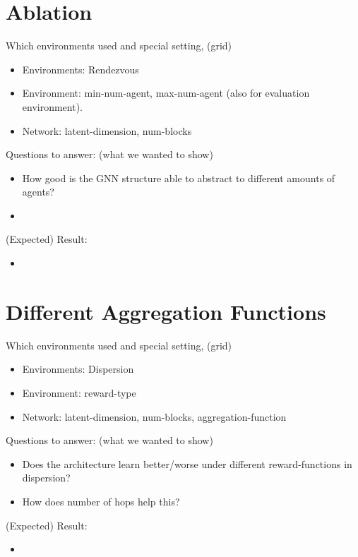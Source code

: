 \section{Ablation}
\label{sec:Ablation}
Which environments used and special setting, (grid)
\begin{itemize}[noitemsep,nolistsep]
    \item Environments: Rendezvous
    \item Environment: min-num-agent, max-num-agent (also for evaluation environment).
    \item Network: latent-dimension, num-blocks
\end{itemize}
Questions to answer: (what we wanted to show)
\begin{itemize}[noitemsep,nolistsep]
    \item How good is the GNN structure able to abstract to different amounts of agents?
    \item 
\end{itemize}
(Expected) Result:
\begin{itemize}[noitemsep,nolistsep]
    \item 
\end{itemize}



\section{Different Aggregation Functions}
\label{sec:Different Aggregation Functions}
Which environments used and special setting, (grid)
\begin{itemize}[noitemsep,nolistsep]
    \item Environments: Dispersion
    \item Environment: reward-type
    \item Network: latent-dimension, num-blocks, aggregation-function
\end{itemize}
Questions to answer: (what we wanted to show)
\begin{itemize}[noitemsep,nolistsep]
    \item Does the architecture learn better/worse under different reward-functions in dispersion?
    \item How does number of hops help this?
\end{itemize}
(Expected) Result:
\begin{itemize}[noitemsep,nolistsep]
    \item 
\end{itemize}


